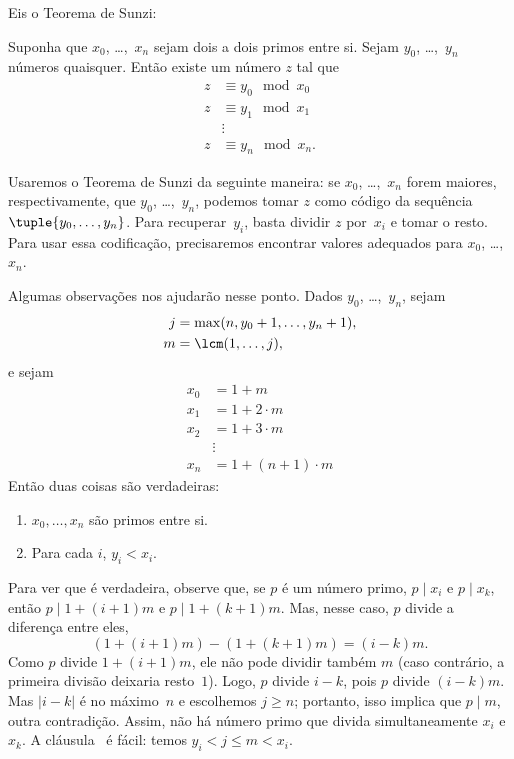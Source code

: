 \documentclass[../../../include/open-logic-section]{subfiles}
\begin{document}
Eis o Teorema de Sunzi:
\begin{thm}
Suponha que $x_0$, \dots,~$x_n$ sejam dois a dois primos entre si.
Sejam $y_0$, \dots,~$y_n$ números quaisquer. Então existe um número $z$
tal que
\begin{align*}
z & \equiv y_0 \mod x_0 \\
z & \equiv y_1 \mod x_1 \\
& \vdots  \\
z & \equiv y_n \mod x_n.
\end{align*}
\end{thm}

Usaremos o Teorema de Sunzi da seguinte maneira: se $x_0$,
\dots,~$x_n$ forem maiores, respectivamente, que $y_0$, \dots,~$y_n$,
podemos tomar $z$ como código da sequência $\tuple{y_0, \dots,y_n}$.
Para recuperar~$y_i$, basta dividir $z$ por~$x_i$ e tomar o resto. Para
usar essa codificação, precisaremos encontrar valores adequados para
$x_0$, \dots,~$x_n$.

Algumas observações nos ajudarão nesse ponto. Dados
$y_0$, \dots,~$y_n$, sejam
\begin{align*}
j &= \max(n, y_0 + 1, \dots, y_n + 1), \\
m &= \lcm(1,\dots,j),
\end{align*}
e sejam
\begin{align*}
x_0 & = 1 + m \\
x_1 & = 1 + 2 \cdot m \\
x_2 & = 1 + 3 \cdot m \\
& \vdots  \\
x_n & = 1 + (n+1) \cdot m
\end{align*}
Então duas coisas são verdadeiras:
\begin{enumerate}
\item{} $x_0,\dots,x_n$ são primos entre si.
\item{} Para cada $i$, $y_i < x_i$.
\end{enumerate}
Para ver que  é verdadeira, observe que, se $p$ é um
número primo, $p \mid x_i$ e $p \mid x_k$, então
$p \mid 1 + (i+1) m$ e $p \mid 1 + (k+1) m$. Mas, nesse caso, $p$
divide a diferença entre eles,
\[
(1 + (i+1)m) - (1+ (k+1)m) = (i-k) m.
\]
Como $p$ divide $1 + (i+1)m$, ele não pode dividir também $m$ (caso
contrário, a primeira divisão deixaria resto~$1$). Logo, $p$ divide
$i-k$, pois $p$ divide $(i-k)m$. Mas $\left|i-k\right|$ é no máximo~$n$
e escolhemos $j \geq n$; portanto, isso implica que $p \mid m$, outra
contradição. Assim, não há número primo que divida simultaneamente
$x_i$ e $x_k$. A cláusula~ é fácil: temos
$y_i < j \leq m < x_i$.
\end{document}
